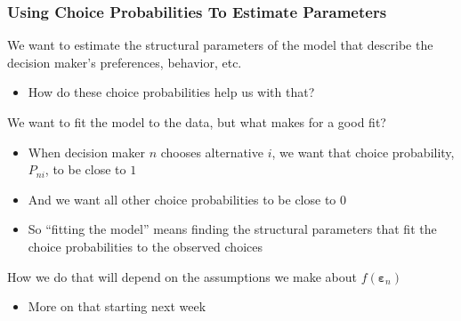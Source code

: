 \documentclass{beamer}
\begin{document}
\begin{frame}\frametitle{Using Choice Probabilities To Estimate Parameters}    
    We want to estimate the structural parameters of the model that describe the decision maker's preferences, behavior, etc.
    \begin{itemize}
        \item How do these choice probabilities help us with that?
    \end{itemize}
    \vspace{2ex}
    We want to fit the model to the data, but what makes for a good fit?
    \begin{itemize}
        \item When decision maker $n$ chooses alternative $i$, we want that choice probability, $P_{ni}$, to be close to $1$
        \item And we want all other choice probabilities to be close to $0$
        \item So ``fitting the model'' means finding the structural parameters that fit the choice probabilities to the observed choices
    \end{itemize}
    \vspace{2ex}
    How we do that will depend on the assumptions we make about $f(\bm{\varepsilon}_n)$
    \begin{itemize}
        \item More on that starting next week
    \end{itemize}
\end{frame}
\end{document}

